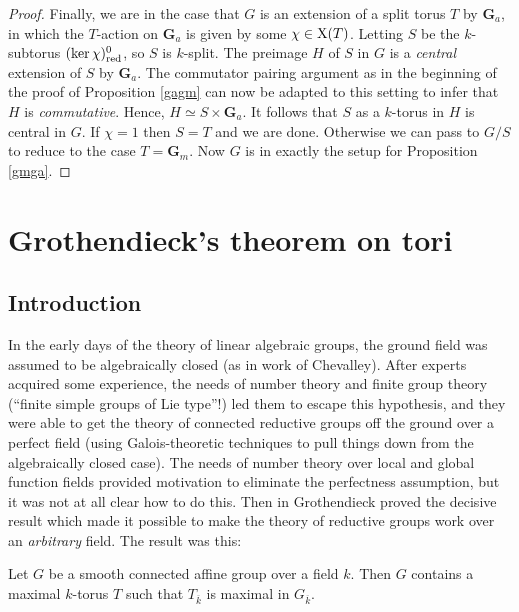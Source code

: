 \documentclass[10pt]{article}
\renewcommand{\(}{\left(}
\renewcommand{\)}{\right)}
\numberwithin{thm}{subsection}
\begin{document}
\begin{proof}
Finally, we are in the case that $G$ is an extension of a split torus $T$
by $\mathbf{G}_a$, in which the $T$-action on $\mathbf{G}_a$ is
given by some $\chi \in {\rm{X}}(T)$. 
Letting $S$ be the $k$-subtorus $(\ker \chi)_{\rm{red}}^0$, so $S$ is $k$-split.
The preimage $H$ of $S$ in $G$ is a {\em central} extension of $S$ by $\mathbf{G}_a$.
The commutator pairing argument as in the beginning of the proof of
Proposition \ref{gagm} can now be adapted to this setting to infer
that $H$ is {\em commutative}.   Hence, $H \simeq S \times \mathbf{G}_a$.  
It follows that $S$ as a $k$-torus in $H$ is central in $G$.  If $\chi = 1$
then $S = T$ and we are done.  Otherwise we can pass 
to $G/S$ to reduce to the case $T = \mathbf{G}_m$.  Now
$G$ is in exactly the setup for Proposition \ref{gmga}.
\end{proof}

\section{Grothendieck's theorem on tori}\label{grthmapp}

\subsection{Introduction}

In the early days of the theory of linear algebraic groups, the ground field was
assumed to be algebraically closed (as in work of Chevalley).  
After experts acquired some experience, the needs
of number theory and finite group theory (``finite simple groups
of Lie type''!) led them to escape this hypothesis, and they were able to get the theory
of connected reductive groups
off the ground over a perfect field (using Galois-theoretic techniques to pull things down
from the algebraically closed case).  The needs of number theory over local and global
function fields provided motivation to eliminate the perfectness assumption, but
it was not at all clear how to do this.  Then in \cite[XIV, Thm.\,1.1]{sga3} Grothendieck 
proved the decisive result which made it possible to make the theory of reductive
groups work over an {\em arbitrary} field.  The result was this:

\begin{thm}[Grothendieck]\label{grthm} Let $G$ be a smooth connected affine group over a field $k$.
Then $G$ contains a maximal $k$-torus $T$ such that $T_{\overline{k}}$ is maximal
in $G_{\overline{k}}$.
\end{thm}
\end{document}
